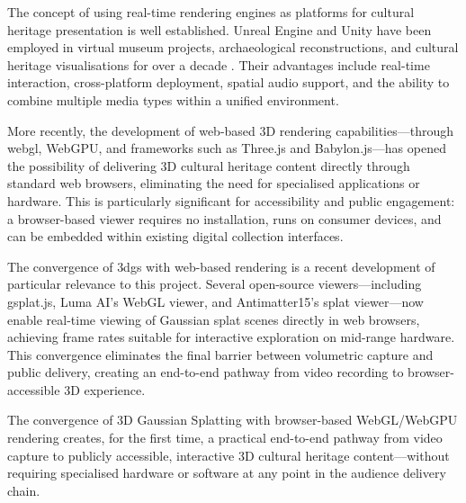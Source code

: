 The concept of using real-time rendering engines as platforms for cultural heritage presentation is well established. Unreal Engine and Unity have been employed in virtual museum projects, archaeological reconstructions, and cultural heritage visualisations for over a decade \parencite{Champion2011, Mortara2014}. Their advantages include real-time interaction, cross-platform deployment, spatial audio support, and the ability to combine multiple media types within a unified environment.

More recently, the development of web-based 3D rendering capabilities---through \acrshort{webgl}, WebGPU, and frameworks such as Three.js and Babylon.js---has opened the possibility of delivering 3D cultural heritage content directly through standard web browsers, eliminating the need for specialised applications or hardware. This is particularly significant for accessibility and public engagement: a browser-based viewer requires no installation, runs on consumer devices, and can be embedded within existing digital collection interfaces.

The convergence of \acrshort{3dgs} with web-based rendering is a recent development of particular relevance to this project. Several open-source viewers---including gsplat.js, Luma AI's WebGL viewer, and Antimatter15's splat viewer---now enable real-time viewing of Gaussian splat scenes directly in web browsers, achieving frame rates suitable for interactive exploration on mid-range hardware. This convergence eliminates the final barrier between volumetric capture and public delivery, creating an end-to-end pathway from video recording to browser-accessible 3D experience.

\begin{keyfinding}
The convergence of 3D Gaussian Splatting with browser-based WebGL/WebGPU rendering creates, for the first time, a practical end-to-end pathway from video capture to publicly accessible, interactive 3D cultural heritage content---without requiring specialised hardware or software at any point in the audience delivery chain.
\end{keyfinding}
